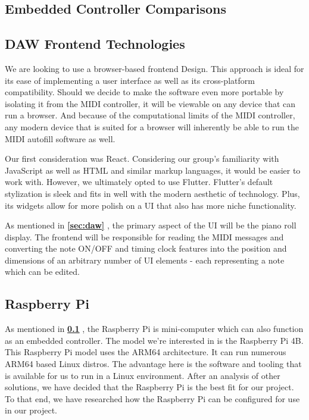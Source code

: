 \blindtext

\subsection{Embedded Controller Comparisons}
\label{sec:embedded_controllers}

\blindtext

\subsection{DAW Frontend Technologies}

We are looking to use a browser-based frontend Design. This approach is ideal for its ease of
implementing a user interface as well as its cross-platform compatibility. Should we decide to
make the software even more portable by isolating it from the MIDI controller, it will be viewable
on any device that can run a browser. And because of the computational limits of the MIDI
controller, any modern device that is suited for a browser will inherently be able to run the
MIDI autofill software as well.

Our first consideration was React. Considering our group's familiarity with JavaScript as well as
HTML and similar markup languages, it would be easier to work with. However, we ultimately opted to
use Flutter. Flutter's default stylization is sleek and fits in well with the modern aesthetic of
technology. Plus, its widgets allow for more polish on a UI that also has more niche functionality.

As mentioned in \textbf{\ref{sec:daw} }, the primary aspect of the UI will be the piano roll display.
The frontend will be responsible for reading the MIDI messages and converting the note ON/OFF and
timing clock features into the position and dimensions of an arbitrary number of UI elements -
each representing a note which can be edited.

\subsection{Raspberry Pi}

As mentioned in \textbf{\ref{sec:embedded_controllers} }, the Raspberry Pi is mini-computer
which can also function as an embedded controller. The model we're interested in is the
Raspberry Pi 4B. This Raspberry Pi model uses the ARM64 architecture. It can run numerous
ARM64 based Linux distros. The advantage here is the software and tooling that is
available for us to run in a Linux environment. After an analysis of other solutions, we
have decided that the Raspberry Pi is the best fit for our project. To that end, we have
researched how the Raspberry Pi can be configured for use in our project.

